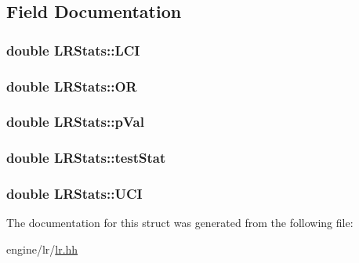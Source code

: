 \subsection{Field Documentation}
\hypertarget{structLRStats_a7a5645105fa178c1ae07ea41ce7265a7}{
\subsubsection[{LCI}]{\setlength{\rightskip}{0pt plus 5cm}double {\bf LRStats::LCI}}}
\label{structLRStats_a7a5645105fa178c1ae07ea41ce7265a7}
\hypertarget{structLRStats_ad2dc69ad8ef363196f7e1eb518d2749f}{
\subsubsection[{OR}]{\setlength{\rightskip}{0pt plus 5cm}double {\bf LRStats::OR}}}
\label{structLRStats_ad2dc69ad8ef363196f7e1eb518d2749f}
\hypertarget{structLRStats_ab9c060dd747842d661d3ac3d3e7e7d8a}{
\subsubsection[{pVal}]{\setlength{\rightskip}{0pt plus 5cm}double {\bf LRStats::pVal}}}
\label{structLRStats_ab9c060dd747842d661d3ac3d3e7e7d8a}
\hypertarget{structLRStats_a56946d63e769f7028683ce7899edd568}{
\subsubsection[{testStat}]{\setlength{\rightskip}{0pt plus 5cm}double {\bf LRStats::testStat}}}
\label{structLRStats_a56946d63e769f7028683ce7899edd568}
\hypertarget{structLRStats_a732a4d2d532d710c0eebbd55a5ea1cd4}{
\subsubsection[{UCI}]{\setlength{\rightskip}{0pt plus 5cm}double {\bf LRStats::UCI}}}
\label{structLRStats_a732a4d2d532d710c0eebbd55a5ea1cd4}


The documentation for this struct was generated from the following file:\begin{DoxyCompactItemize}
\item 
engine/lr/\hyperlink{lr_8hh}{lr.hh}\end{DoxyCompactItemize}
